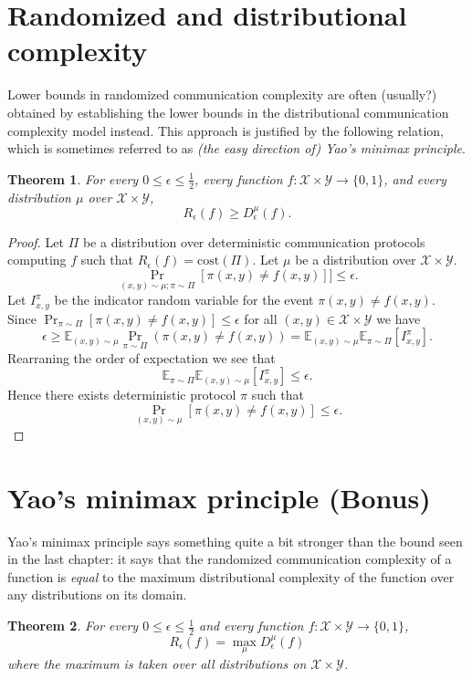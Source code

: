 \documentclass[11pt]{amsart}
\theoremstyle{plain}
\newtheorem{theorem}{Theorem}
\theoremstyle{definition}
\theoremstyle{plain}
\newcommand{\calX}{\mathcal{X}}
\newcommand{\calY}{\mathcal{Y}}
\newcommand{\cost}{\mathrm{cost}}
\begin{document}
\newpage 
\section{Randomized and distributional complexity}

Lower bounds in randomized communication complexity are often (usually?) obtained by establishing the lower bounds in the distributional communication complexity model instead. This approach is justified by the following relation, which is sometimes referred to as \emph{(the easy direction of) Yao's minimax principle}.

\begin{theorem}
For every $0 \le \epsilon \le \frac12$, every function $f : \calX \times \calY \to \{0,1\}$, and every distribution $\mu$ over $\calX \times \calY$,
\[
R_\epsilon(f) \ge D_\epsilon^\mu(f).
\]
\end{theorem}

\begin{proof}
Let $\Pi$ be a distribution over deterministic communication protocols computing $f$ such that $R_\epsilon(f) = \cost(\Pi)$. Let $\mu$ be a distribution over $\calX\times\calY$. 
$$\Pr_{(x,y)\sim \mu ;\pi\sim \Pi}[\pi(x,y)\neq f(x,y)]] \leq \epsilon.$$
Let $I^\pi_{x,y}$ be the indicator random variable for the event $\pi(x,y)\neq f(x,y)$. Since $\Pr_{\pi \sim \Pi}[\pi(x,y)\neq f(x,y)]\leq \epsilon$ for all $(x,y) \in \calX \times \calY$ we have
$$ \epsilon \geq \mathbb{E}_{ (x,y) \sim \mu} \Pr_{\pi\sim \Pi}(\pi(x,y)\neq f(x,y)) = \mathbb{E}_{ (x,y) \sim \mu} \mathbb{E}_{\pi\sim \Pi}[I^\pi_{x,y}].$$ 
Rearraning the order of expectation we see that
$$ \mathbb{E}_{ \pi\sim \Pi} \mathbb{E}_{(x,y) \sim \mu}[I^\pi_{x,y}] \leq \epsilon.$$
Hence there exists deterministic protocol $\pi$ such that 
$$\Pr_{(x,y)\sim \mu}[\pi(x,y) \neq f(x,y)] \leq \epsilon.$$
\end{proof}


\newpage 
\section{Yao's minimax principle (Bonus)}

Yao's minimax principle says something quite a bit stronger than the bound seen in the last chapter: it says that the randomized communication complexity of a function is \emph{equal} to the maximum distributional complexity of the function over any distributions on its domain.

\begin{theorem}
For every $0 \le \epsilon \le \frac12$ and every function $f : \calX \times \calY \to \{0,1\}$, 
\[
R_\epsilon(f) = \max_{\mu} D_\epsilon^\mu(f)
\]
where the maximum is taken over all distributions on $\calX \times \calY$.
\end{theorem}
\end{document}
